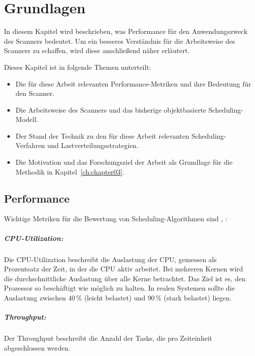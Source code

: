 \chapter{Grundlagen}
\begin{sloppypar}
In diesem Kapitel wird beschrieben, was Performance für den Anwendungszweck des Scanners bedeutet.
Um ein besseres Verständnis für die Arbeitsweise des Scanners zu schaffen, wird diese anschließend näher erläutert.

\vspace{7.56mm}

\noindent Dieses Kapitel ist in folgende Themen unterteilt:
\begin{itemize}
    \item Die für diese Arbeit relevanten Performance-Metriken und ihre Bedeutung für den Scanner.
    \item Die Arbeitsweise des Scanners und das bisherige objektbasierte Scheduling-Modell.
    \item Der Stand der Technik zu den für diese Arbeit relevanten Scheduling-Verfahren und Lastverteilungsstrategien.
    \item Die Motivation und das Forschungsziel der Arbeit als Grundlage für die Methodik in Kapitel~\ref{ch:chapter03}.
\end{itemize}

\section{Performance}
Wichtige Metriken für die Bewertung von Scheduling-Algorithmen sind \cite[S.~204--205]{Silberschatz:2018}, \cite[S.~154]{Tanenbaum:2015}:

\paragraph{CPU-Utilization:}
Die CPU-Utilization beschreibt die Auslastung der \acs{CPU}, gemessen als Prozentsatz der Zeit, in der die \acs{CPU} aktiv arbeitet.
Bei mehreren Kernen wird die durchschnittliche Auslastung über alle Kerne betrachtet.
Das Ziel ist es, den Prozessor so beschäftigt wie möglich zu halten.
In realen Systemen sollte die Auslastung zwischen 40\,\% (leicht belastet) und 90\,\% (stark belastet) liegen.

\paragraph{Throughput:}
Der Throughput beschreibt die Anzahl der Tasks, die pro Zeiteinheit abgeschlossen werden.


\end{sloppypar}
